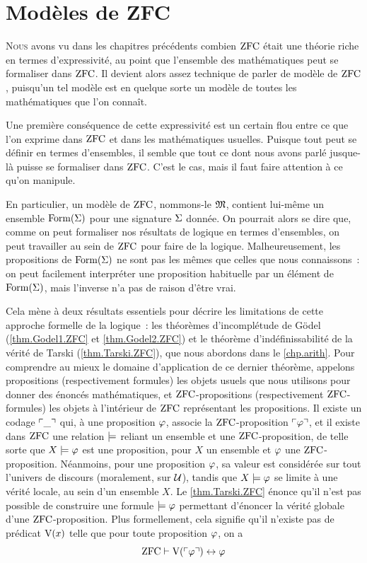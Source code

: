 \chapter{Modèles de ZFC}
\label{chp.modZFC}

\minitoc

\lettrine{N}{ous} avons vu dans les chapitres précédents combien $\operatorname{ZFC}$ était
une théorie riche en termes d'expressivité, au point que l'ensemble des
mathématiques peut se formaliser dans $\operatorname{ZFC}$. Il devient alors assez technique
de parler de modèle de $\operatorname{ZFC}$, puisqu'un tel modèle est en quelque sorte un
modèle de toutes les mathématiques que l'on connaît.

Une première conséquence de cette expressivité est un certain flou entre ce que
l'on exprime dans $\operatorname{ZFC}$ et dans les mathématiques usuelles. Puisque tout peut
se définir en termes d'ensembles, il semble que tout ce dont nous avons parlé
jusque-là puisse se formaliser dans $\operatorname{ZFC}$. C'est le cas, mais il faut faire
attention à ce qu'on manipule.

En particulier, un modèle de $\operatorname{ZFC}$, nommons-le $\mathfrak{M}$, contient lui-même
un ensemble $\operatorname{Form}(\Sigma)$ pour une signature $\Sigma$ donnée. On pourrait
alors se dire que, comme on peut formaliser nos résultats de logique en termes
d'ensembles, on peut travailler au sein de $\operatorname{ZFC}$ pour faire de la logique.
Malheureusement, les propositions de $\operatorname{Form}(\Sigma)$ ne sont pas les mêmes
que celles que nous connaissons~: on peut facilement interpréter une proposition
habituelle par un élément de $\operatorname{Form}(\Sigma)$, mais l'inverse n'a pas de
raison d'être vrai.

Cela mène à deux résultats essentiels pour décrire les limitations de cette
approche formelle de la logique~: les théorèmes d'incomplétude de Gödel
(\cref{thm.Godel1.ZFC} et \cref{thm.Godel2.ZFC}) et le théorème
d'indéfinissabilité de la vérité de Tarski (\cref{thm.Tarski.ZFC}), que nous
abordons dans le \cref{chp.arith}. Pour comprendre au mieux le domaine
d'application de ce dernier théorème, appelons propositions (respectivement
formules) les objets usuels que nous utilisons pour donner des énoncés
mathématiques, et $\operatorname{ZFC}$-propositions (respectivement $\operatorname{ZFC}$-formules) les
objets à l'intérieur de $\operatorname{ZFC}$ représentant les propositions.
Il existe un codage $\ulcorner\mathord{\_}\urcorner$ qui, à une proposition $\varphi$, associe la
$\operatorname{ZFC}$-proposition $\ulcorner\varphi\urcorner$, et il existe dans $\operatorname{ZFC}$ une relation
$\models$ reliant un ensemble et une $\operatorname{ZFC}$-proposition, de telle sorte que
$X\models \varphi$ est une proposition, pour $X$ un ensemble et $\varphi$ une
$\operatorname{ZFC}$-proposition. Néanmoins, pour une proposition $\varphi$, sa valeur est
considérée sur tout l'univers de discours (moralement, sur $\mathcal{U}$), tandis que
$X\models \varphi$ se limite à une vérité \og locale\fg, au sein d'un ensemble
$X$. Le \cref{thm.Tarski.ZFC} énonce qu'il n'est pas possible de construire une
formule $\models\varphi$ permettant d'énoncer la vérité globale d'une
$\operatorname{ZFC}$-proposition. Plus formellement, cela signifie qu'il n'existe pas de
prédicat $\mathrm{V}(x)$ telle que pour toute proposition $\varphi$, on a
\[\operatorname{ZFC}\vdash \mathrm{V}(\ulcorner\varphi\urcorner) \mathrel{\leftrightarrow} \varphi\]

